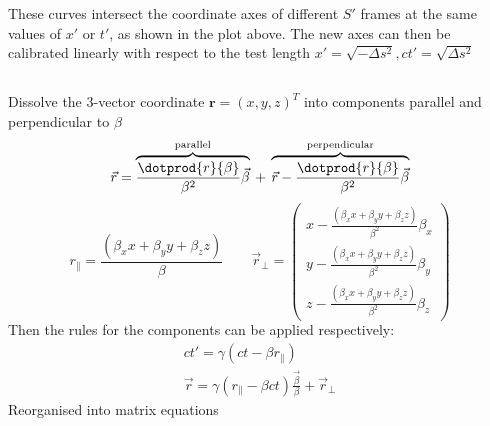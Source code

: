\documentclass[12pt]{article}
\begin{document}
            These curves intersect the coordinate axes of different $S'$ frames at the same values of $x'$ or $t'$, as shown in the plot above. The new axes can then be calibrated linearly with respect to the test length $x'=\sqrt{- \Delta s^2}, ct'=\sqrt{\Delta s^2}$
            \subsubsection{} \text{ }
            \begin{center}
                \def\svgwidth{400pt}
            \end{center}
        \subsection{} Dissolve the 3-vector coordinate $\mathbf{r}=(x,y,z)^T$ into components parallel and perpendicular to $\beta$
        \[
            \vec{r} = \overbrace{\frac{\dotprod{r}{\beta}}{\beta^2}\vec{\beta}}^\text{parallel}\: +\: \overbrace{\vec{r} - \frac{\dotprod{r}{\beta}}{\beta^2}\vec{\beta}}^\text{perpendicular}
        \]
        \[
            r_\parallel = \frac{(\beta_x x +\beta
            _y y + \beta_z z)}{\beta}\qquad \vec r_\perp = \begin{pmatrix}
                x -\frac{(\beta_x x +\beta
            _y y + \beta_z z)}{\beta^2}\beta_x\\
            y -\frac{(\beta_x x +\beta
            _y y + \beta_z z)}{\beta^2}\beta_y\\
            z -\frac{(\beta_x x +\beta
            _y y + \beta_z z)}{\beta^2}\beta_z
            \end{pmatrix}
        \]
        Then the rules for the components can be applied respectively:
        \begin{gather*}
            ct' = \gamma (ct - \beta r_\parallel)\\
            \vec{r} = \gamma(r_\parallel - \beta ct)\frac{\vec\beta}{\beta} + \vec{r}_\perp
        \end{gather*}
        Reorganised into matrix equations
\end{document}
